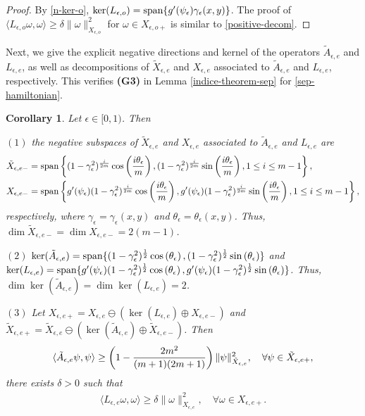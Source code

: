 \documentclass[1 [leqno, 11pt]{amsart}
\numberwithin{equation}{section}
\let\ep=\epsilon
\newtheorem{Corollary}[Theorem]{Corollary}
\begin{document}
\begin{CJK*}{GBK}{song}
\begin{proof}
By \eqref{n-ker-o},  $\ker (L_{\ep,o})=\textup{span}\{g'(\psi_\ep)\gamma_\ep(x,y)\}$.
The proof of $\langle L_{\ep,o} \omega,\omega\rangle \geq \delta \| \omega\|_{ X_{\ep,o}}^2$ for   $\omega\in  X_{\ep,o+} $ is similar to  \eqref{positive-decom}.
\end{proof}


Next, we give
 the explicit negative directions and  kernel of  the operators $\tilde A_{\ep,e}$ and $L_{\ep,e}$, as well as   decompositions of
$\tilde X_{\ep,e}$ and $X_{\ep,e}$  associated to $\tilde A_{\ep,e}$ and $L_{\ep,e}$, respectively. This verifies  {\textbf{(G3)}} in Lemma \ref{indice-theorem-sep} for \eqref{sep-hamiltonian}.

\begin{Corollary}\label{A-L-dec-e}
 Let $\ep\in[0,1)$. Then

$(1)$  the negative subspaces of  $\tilde X_{\ep, e}$ and  $ X_{\ep, e}$  associated to $\tilde A_{\ep,e}$ and $L_{\ep,e}$ are
 \begin{align*}
\tilde X_{\ep,e-}&=\textup{span}\left\{(1-\gamma_\ep^2)^{i\over 2m}\cos\left({i\theta_\ep\over m}\right),(1-\gamma_\ep^2)^{i\over 2m}\sin\left({i\theta_\ep\over m}\right), 1\leq i\leq m-1\right\},\\
 X_{\ep,e-}&=\textup{span}\left\{g'(\psi_\ep)(1-\gamma_\ep^2)^{i\over 2m}\cos\left({i\theta_\ep\over m}\right),g'(\psi_\ep)(1-\gamma_\ep^2)^{i\over 2m}\sin\left({i\theta_\ep\over m}\right), 1\leq i\leq m-1\right\},
\end{align*}
respectively, where $\gamma_\ep=\gamma_\ep(x,y)$ and $\theta_\ep=\theta_\ep(x,y)$.
Thus,  $\dim \tilde X_{\ep,e-}=\dim X_{\ep,e-}=2(m-1)$.

$(2)$ $\ker (\tilde A_{\ep,e})=\textup{span}\{(1-\gamma_\ep^2)^{1\over 2}\cos\left({\theta_\ep}\right),(1-\gamma_\ep^2)^{1\over 2}\sin\left({\theta_\ep}\right)\}$ and $\ker (L_{\ep,e})=\textup{span}\{g'(\psi_\ep)(1-\gamma_\ep^2)^{1\over 2}\cos\left({\theta_\ep}\right),g'(\psi_\ep)(1-\gamma_\ep^2)^{1\over 2}\sin\left({\theta_\ep}\right)\}$. Thus,  $\dim\ker (\tilde A_{\ep,e})=\dim \ker(L_{\ep,e})=2$.

$(3)$ Let  $ X_{\ep,e+}= X_{\ep,e} \ominus\left(\ker (L_{\ep,e})\oplus X_{\ep,e-}\right)$ and $\tilde X_{\ep,e+}=\tilde X_{\ep,e} \ominus\left(\ker (\tilde A_{\ep,e})\oplus \tilde  X_{\ep,e-}\right)$. Then
\begin{align*}
\langle \tilde A_{\ep,e} \psi,\psi\rangle \geq \left(1-{2m^2\over (m+1)(2m+1)}\right) \| \psi\|_{\tilde X_{\ep,e}}^2, \quad\forall \psi\in \tilde X_{\ep,e+},
\end{align*}
there exists $\delta>0$ such that
\begin{align*}
\langle L_{\ep,e} \omega,\omega\rangle \geq \delta \| \omega\|_{ X_{\ep,e}}^2, \quad \forall \omega\in  X_{\ep,e+}.
\end{align*}
\end{Corollary}





\end{CJK*}
\end{document}
